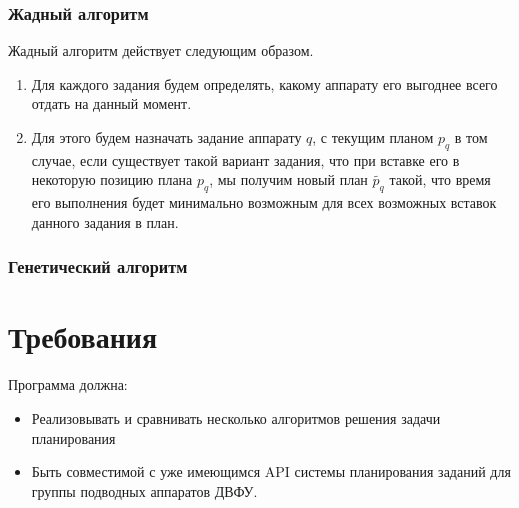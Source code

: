 \documentclass[a4paper,14pt,russian]{article}
\begin{document}

\subsubsection{Жадный алгоритм}
Жадный алгоритм действует следующим образом.



\begin{enumerate}
\item Для каждого задания будем определять, какому аппарату его выгоднее всего отдать на данный момент.
\item Для этого будем назначать задание аппарату $q$, с текущим планом $p_q$ в том случае, если существует такой вариант задания, что при вставке его в некоторую позицию плана $p_q$, мы получим новый план $\widetilde{p_q}$ такой, что время его выполнения будет минимально возможным для всех возможных вставок данного задания в план.
\end{enumerate}
\subsubsection{Генетический алгоритм}


\section{Требования}



Программа должна:
\begin{itemize}
\item Реализовывать и сравнивать несколько алгоритмов решения задачи планирования
\item Быть совместимой с уже имеющимся API системы планирования заданий для группы подводных аппаратов ДВФУ.
\end{itemize}
\end{document}
